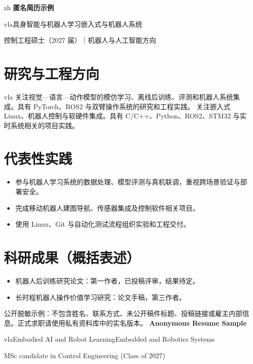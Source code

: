 \documentclass[10.5pt,a4paper]{ctexart}
\def\zh{zh}
\def\vla{vla}
\begin{document}
\ifx\ResumeLanguage\zh
  {\LARGE\bfseries 匿名简历示例}\par
  \vspace{0.2em}
  {\color{accent}\large\ifx\ResumeTrack\vla 具身智能与机器人学习\else 嵌入式与机器人系统\fi}\par
  \vspace{0.5em}
  \noindent 控制工程硕士（2027 届）｜机器人与人工智能方向\par
  \section*{研究与工程方向}
  \ifx\ResumeTrack\vla
    关注视觉—语言—动作模型的模仿学习、离线后训练、评测和机器人系统集成。具有 PyTorch、ROS2 与双臂操作系统的研究和工程实践。
  \else
    关注嵌入式 Linux、机器人控制与软硬件集成。具有 C/C++、Python、ROS2、STM32 与实时系统相关的项目实践。
  \fi
  \section*{代表性实践}
  \begin{itemize}
    \item 参与机器人学习系统的数据处理、模型评测与真机联调，重视跨场景验证与部署安全。
    \item 完成移动机器人建图导航、传感器集成及控制软件相关项目。
    \item 使用 Linux、Git 与自动化测试流程组织实验和工程交付。
  \end{itemize}
  \section*{科研成果（概括表述）}
  \begin{itemize}
    \item 机器人后训练研究论文：第一作者，已投稿评审，结果待定。
    \item 长时程机器人操作价值学习研究：论文手稿，第三作者。
  \end{itemize}
  \vfill
  {\footnotesize\color{gray}公开脱敏示例：不包含姓名、联系方式、未公开稿件标题、投稿链接或雇主内部信息。正式求职请使用私有资料库中的实名版本。}
\else
  {\LARGE\bfseries Anonymous Resume Sample}\par
  \vspace{0.2em}
  {\color{accent}\large\ifx\ResumeTrack\vla Embodied AI and Robot Learning\else Embedded and Robotics Systems\fi}\par
  \vspace{0.5em}
  \noindent MSc candidate in Control Engineering (Class of 2027)\par
\end{document}
